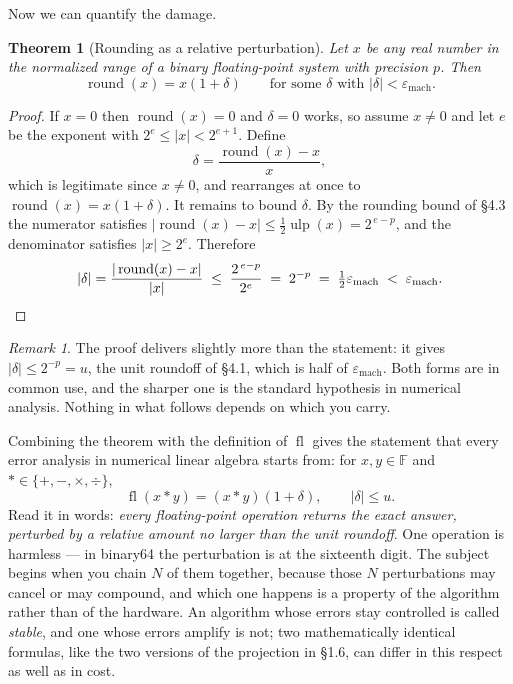 \documentclass[11pt]{article}
\theoremstyle{plain}
\newtheorem{thm}{Theorem}[section]
\theoremstyle{definition}
\theoremstyle{remark}
\newtheorem*{rmk}{Remark}
\newcommand{\F}{\mathbb{F}}
\newcommand{\epsm}{\varepsilon_{\mathrm{mach}}}
\begin{document}
Now we can quantify the damage.

\begin{thm}[Rounding as a relative perturbation]
Let $x$ be any real number in the normalized range of a binary floating-point
system with precision $p$. Then
\[
  \operatorname{round}(x) = x(1+\delta)
  \qquad\text{for some } \delta \text{ with }
  |\delta| < \epsm .
\]
\end{thm}

\begin{proof}
If $x=0$ then $\operatorname{round}(x)=0$ and $\delta=0$ works, so assume
$x\neq0$ and let $e$ be the exponent with $2^{e}\le|x|<2^{e+1}$. Define
\[
  \delta = \frac{\operatorname{round}(x)-x}{x},
\]
which is legitimate since $x\neq0$, and rearranges at once to
$\operatorname{round}(x)=x(1+\delta)$. It remains to bound $\delta$. By the
rounding bound of \S4.3 the numerator satisfies
$|\operatorname{round}(x)-x|\le\tfrac12\operatorname{ulp}(x)=2^{\,e-p}$, and the
denominator satisfies $|x|\ge2^{e}$. Therefore
\[
  |\delta| = \frac{|\operatorname{round}(x)-x|}{|x|}
           \;\le\; \frac{2^{\,e-p}}{2^{e}}
           \;=\; 2^{-p}
           \;=\; \tfrac12\epsm
           \;<\; \epsm . \qedhere
\]
\end{proof}

\begin{rmk}
The proof delivers slightly more than the statement: it gives
$|\delta|\le 2^{-p}=u$, the unit roundoff of \S4.1, which is half of
$\epsm$. Both forms are in common use, and the sharper one
is the standard hypothesis in numerical analysis. Nothing in what follows
depends on which you carry.
\end{rmk}

\noindent Combining the theorem with the definition of $\operatorname{fl}$ gives
the statement that every error analysis in numerical linear algebra starts from:
for $x,y\in\F$ and $\ast\in\{+,-,\times,\div\}$,
\[
  \boxed{\;\operatorname{fl}(x\ast y) = (x\ast y)(1+\delta),
          \qquad |\delta|\le u .\;}
\]
Read it in words: \emph{every floating-point operation returns the exact answer,
perturbed by a relative amount no larger than the unit roundoff}. One operation
is harmless --- in binary64 the perturbation is at the sixteenth digit. The
subject begins when you chain $N$ of them together, because those $N$
perturbations may cancel or may compound, and which one happens is a property of
the algorithm rather than of the hardware. An algorithm whose errors stay
controlled is called \emph{stable}, and one whose errors amplify is not; two
mathematically identical formulas, like the two versions of the projection in
\S1.6, can differ in this respect as well as in cost.
\end{document}
